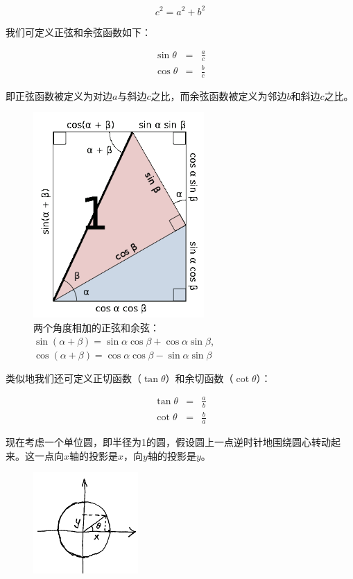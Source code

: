 \begin{equation}
c^2 = a^2 + b^2
\end{equation}

我们可定义正弦和余弦函数如下：

\begin{eqnarray}
\sin \theta & = & \frac{a}{c} \\
\cos \theta & = & \frac{b}{c}
\end{eqnarray}

即正弦函数被定义为对边$a$与斜边$c$之比，而余弦函数被定义为邻边$b$和斜边$c$之比。

\begin{figure}[htbp]
\begin{center}
\includegraphics[width=6.5cm]{Preface/angleaddition.png}
\caption{两个角度相加的正弦和余弦：$\sin (\alpha + \beta) = \sin \alpha \cos \beta + \cos \alpha \sin \beta$, $\cos (\alpha + \beta ) = \cos \alpha \cos \beta - \sin \alpha \sin \beta$}
\end{center}
\end{figure}

类似地我们还可定义正切函数（$\tan \theta$）和余切函数（$\cot \theta$）：

\begin{eqnarray}
\tan \theta & = & \frac{a}{b} \\
\cot \theta & = & \frac{b}{a}
\end{eqnarray}

现在考虑一个单位圆，即半径为1的圆，假设圆上一点逆时针地围绕圆心转动起来。这一点向$x$轴的投影是$x$，向$y$轴的投影是$y$。



\begin{figure}[htbp]
\begin{center}
\includegraphics[width=4cm]{Preface/circlexy.png}
\end{center}
\end{figure}


